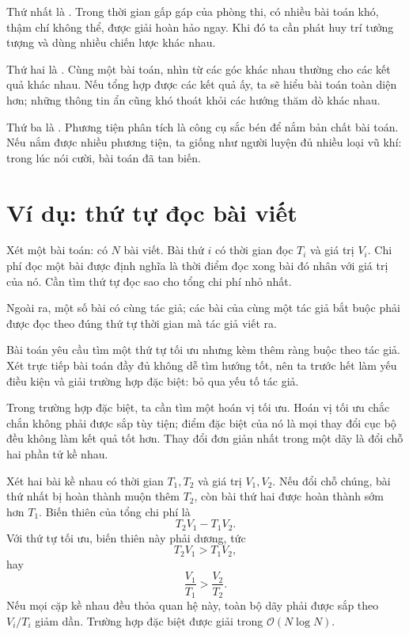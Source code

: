 \documentclass[11pt]{article}
\newcommand{\Oh}{\mathcal{O}}
\begin{document}
Thứ nhất là . Trong thời gian gấp gáp của phòng thi, có
nhiều bài toán khó, thậm chí không thể, được giải hoàn hảo ngay. Khi đó ta
cần phát huy trí tưởng tượng và dùng nhiều chiến lược khác nhau.

Thứ hai là . Cùng một bài toán, nhìn từ các góc khác
nhau thường cho các kết quả khác nhau. Nếu tổng hợp được các kết quả ấy, ta
sẽ hiểu bài toán toàn diện hơn; những thông tin ẩn cũng khó thoát khỏi các
hướng thăm dò khác nhau.

Thứ ba là . Phương tiện phân tích là
công cụ sắc bén để nắm bản chất bài toán. Nếu nắm được nhiều phương tiện, ta
giống như người luyện đủ nhiều loại vũ khí: trong lúc nói cười, bài toán đã
tan biến.

\section{Ví dụ: thứ tự đọc bài viết}

Xét một bài toán: có \(N\) bài viết. Bài thứ \(i\) có thời gian đọc \(T_i\)
và giá trị \(V_i\). Chi phí đọc một bài được định nghĩa là thời điểm đọc xong
bài đó nhân với giá trị của nó. Cần tìm thứ tự đọc sao cho tổng chi phí nhỏ
nhất.

Ngoài ra, một số bài có cùng tác giả; các bài của cùng một tác giả bắt buộc
phải được đọc theo đúng thứ tự thời gian mà tác giả viết ra.

Bài toán yêu cầu tìm một thứ tự tối ưu nhưng kèm thêm ràng buộc theo tác giả.
Xét trực tiếp bài toán đầy đủ không dễ tìm hướng tốt, nên ta trước hết làm
yếu điều kiện và giải trường hợp đặc biệt: bỏ qua yếu tố tác giả.

Trong trường hợp đặc biệt, ta cần tìm một hoán vị tối ưu. Hoán vị tối ưu chắc
chắn không phải được sắp tùy tiện; điểm đặc biệt của nó là mọi thay đổi cục
bộ đều không làm kết quả tốt hơn. Thay đổi đơn giản nhất trong một dãy là đổi
chỗ hai phần tử kề nhau.

Xét hai bài kề nhau có thời gian \(T_1,T_2\) và giá trị \(V_1,V_2\). Nếu đổi
chỗ chúng, bài thứ nhất bị hoàn thành muộn thêm \(T_2\), còn bài thứ hai
được hoàn thành sớm hơn \(T_1\). Biến thiên của tổng chi phí là
\[
  T_2V_1-T_1V_2.
\]
Với thứ tự tối ưu, biến thiên này phải dương, tức
\[
  T_2V_1>T_1V_2,
\]
hay
\[
  \frac{V_1}{T_1}>\frac{V_2}{T_2}.
\]
Nếu mọi cặp kề nhau đều thỏa quan hệ này, toàn bộ dãy phải được sắp theo
\(V_i/T_i\) giảm dần. Trường hợp đặc biệt được giải trong
\(\Oh(N\log N)\).
\end{document}
